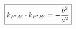 \documentclass[preview]{standalone}
\begin{document}
\begin{align*}
\special{dvisvgm:raw <g id='unique000'>}\boxed{k_{P'A'}\cdot k_{P'B'}=-\frac{b^2}{a^2}}\special{dvisvgm:raw </g>}
\end{align*}
\end{document}
